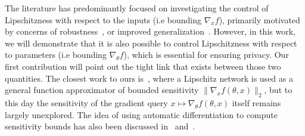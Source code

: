     The literature has predominantly focused on investigating the control of Lipschitzness with respect to the inputs (i.e bounding $\nabla_x f$), primarily motivated by concerns of robustness~\citep{szegedy2013,li2019preventing,fazlyab2019efficient}, or improved generalization~\citep{bartlett2017spectrally, bethune2022pay}. However, in this work, we will demonstrate that it is also possible to control Lipschitzness with respect to parameters (i.e bounding $\nabla_{\theta} f$), which is essential for ensuring privacy. Our first contribution will point out the tight link that exists between those two quantities. The closest work to ours is~\cite{shavit2019exploring}, where a Lipschitz network is used as a general function approximator of bounded sensitivity $\|\nabla_x f(\theta,x)\|_2$, but to this day the sensitivity of the gradient query $x\mapsto \nabla_{\theta}f(\theta,x)$ itself remains largely unexplored. The idea of using automatic differentiation to compute sensitivity bounds has also been discussed in~\cite{ziller2021sensitivity} and~\cite{usynin2021automatic}.  
    
